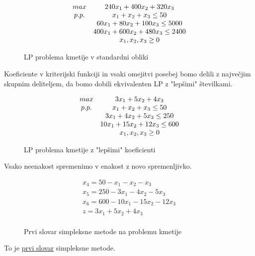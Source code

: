 \documentclass[11pt, a4paper]{article}
\begin{document}
    \begin{example}
        \begin{figure}[h!]
            \[
                \begin{array}{ c c }
                    max & 240x_1+400x_2+320x_3 \\
                    p.p. & x_1+x_2+x_3 \le 50 \\
                    & 60x_1+80x_2+100x_3 \le 5000 \\
                    & 400x_1+600x_2+480x_3 \le 2400 \\
                    & x_1,x_2,x_3 \ge 0 \\
                \end{array}
            \]
            \caption{LP problema kmetije v standardni obliki}
        \end{figure}

        Koeficiente v kriterijski funkciji in vsaki omejitvi posebej bomo delili z največjim skupnim deliteljem, da bomo dobili ekvivalenten LP z "lepšimi" številkami.

        \begin{figure}[h!]
            \[
                \begin{array}{ c c }
                    max & 3x_1+5x_2+4x_3 \\
                    p.p. & x_1+x_2+x_3 \le 50 \\
                    & 3x_1+4x_2+5x_3 \le 250 \\
                    & 10x_1+15x_2+12x_3 \le 600 \\
                    & x_1,x_2,x_3 \ge 0 \\
                \end{array}
            \]
            \caption{LP problema kmetije z "lepšimi" koeficienti}
        \end{figure}

        Vsako neenakost spremenimo v enakost z novo spremenljivko.

        \begin{figure}[h!]
            \[
                \begin{array}{ c }
                    x_4=50-x_1-x_2-x_3 \\
                    x_5=250-3x_1-4x_2-5x_3 \\
                    x_6=600-10x_1-15x_2-12x_3 \\
                    \hline
                    z=3x_1+5x_2+4x_3 \\
                \end{array}
            \]
            \caption{Prvi slovar simpleksne metode na problemu kmetije}
        \end{figure}

        To je \underline{prvi slovar} simpleksne metode.
    \end{example}
    
\end{document}
